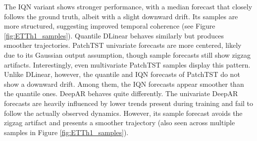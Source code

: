 \documentclass[a4paper,oneside,bibliography=totoc]{scrbook}
\begin{document}
The IQN variant shows stronger performance, with a median forecast that closely follows the ground truth, albeit with a slight downward drift. Its samples are more structured, suggesting improved temporal coherence (see Figure \ref{fig:ETTh1_samples}).
Quantile DLinear behaves similarly but produces smoother trajectories.
PatchTST univariate forecasts are more centered, likely due to its Gaussian output assumption, though sample forecasts still show zigzag artifacts. Interestingly, even multivariate PatchTST samples display this pattern.
Unlike DLinear, however, the quantile and IQN forecasts of PatchTST do not show a downward drift. Among them, the IQN forecasts appear smoother than the quantile ones.
DeepAR behaves quite differently. The univariate DeepAR forecasts are heavily influenced by lower trends present during training and fail to follow the actually observed dynamics. 
However, its sample forecast avoids the zigzag artifact and presents a smoother trajectory (also seen across multiple samples in Figure \ref{fig:ETTh1_samples}). 
\end{document}
